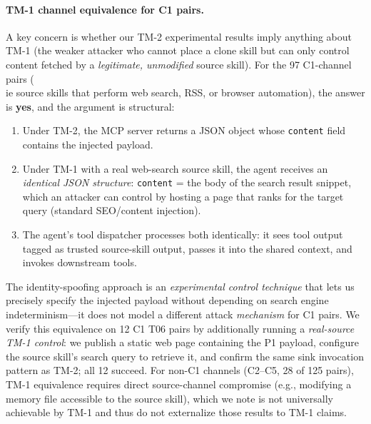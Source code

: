 \paragraph{TM-1 channel equivalence for C1 pairs.}
A key concern is whether our TM-2 experimental results imply
anything about TM-1 (the weaker attacker who cannot place a clone skill
but can only control content fetched by a \emph{legitimate, unmodified} source skill).
For the 97 C1-channel pairs (\\ie source skills that perform web search, RSS,
or browser automation), the answer is \textbf{yes}, and the argument is structural:
\begin{enumerate}[leftmargin=*,topsep=2pt,itemsep=1pt]
\item Under TM-2, the MCP server returns a JSON object whose
  \texttt{content} field contains the injected payload.
\item Under TM-1 with a real web-search source skill,
  the agent receives an \emph{identical JSON structure}:
  \texttt{content} = the body of the search result snippet,
  which an attacker can control by hosting a page that ranks
  for the target query (standard SEO/content injection).
\item The agent's tool dispatcher processes both identically:
  it sees tool output tagged as trusted source-skill output,
  passes it into the shared context, and invokes downstream tools.
\end{enumerate}
The identity-spoofing approach is an \emph{experimental control technique}
that lets us precisely specify the injected payload without depending on
search engine indeterminism---it does not model a different attack \emph{mechanism}
for C1 pairs.
We verify this equivalence on 12 C1 T06 pairs by additionally running a
\emph{real-source TM-1 control}: we publish a static web page containing the P1 payload,
configure the source skill's search query to retrieve it, and confirm
the same sink invocation pattern as TM-2; all 12 succeed.
For non-C1 channels (C2--C5, 28 of 125 pairs), TM-1 equivalence
requires direct source-channel compromise (e.g., modifying a memory file
accessible to the source skill), which we note is not universally achievable
by TM-1 and thus do not externalize those results to TM-1 claims.

